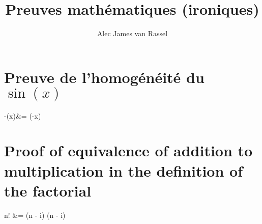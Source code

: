 \documentclass[12pt, titlepage,french]{article}
\begin{document}
\title{Preuves mathématiques (ironiques)}
\vspace{-8ex}
\date{}
\author{Alec James van Rassel}
\maketitle

\tableofcontents
\clearpage

\section*{Preuve de l'homogénéité du $\sin(x)$}

\begin{theorems}[Théorème]
	-\sin(x)&=	\sin(-x) 
\end{theorems}
\clearpage

\section*{Proof of equivalence of addition to multiplication in the definition of the factorial}

\begin{theorems}[Theorem]
	n!	
	&=	 (n - i)	
	\Leftrightarrow		{} (n - i)	
\end{theorems}
\end{document}
